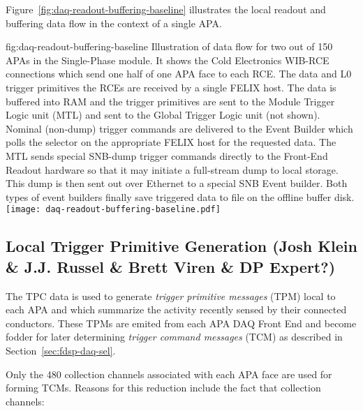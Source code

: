 Figure~\ref{fig:daq-readout-buffering-baseline} illustrates the local
readout and buffering data flow in the context of a single APA.  

\begin{dunefigure}{fig:daq-readout-buffering-baseline}
  {Illustration of data flow for two out of 150 APAs in the
    Single-Phase module. 
    It shows the Cold Electronics WIB-RCE connections which send one
    half of one APA face to each RCE. 
    The data and L0 trigger primitives the RCEs are received by a
    single FELIX host. 
    The data is buffered into RAM and the trigger primitives are sent
    to the Module Trigger Logic unit (MTL) and sent to the Global
    Trigger Logic unit (not shown). 
    Nominal (non-dump) trigger commands are delivered to the Event
    Builder which polls the selector on the appropriate FELIX host for
    the requested data.
    The MTL sends special SNB-dump trigger commands directly to the
    Front-End Readout hardware so that it may initiate a full-stream
    dump to local storage. 
    This dump is then sent out over Ethernet to a special SNB Event
    builder. 
    Both types of event builders finally save triggered data to file
    on the offline buffer disk.}
\texttt{[image: daq-readout-buffering-baseline.pdf]}%
\end{dunefigure}


\subsection{Local Trigger Primitive Generation (Josh Klein \& J.J. Russel \& Brett Viren \& DP Expert?)}
\label{sec:fdsp-daq-ltr}


The TPC data is used to generate \textit{trigger primitive messages}
(TPM) local to each APA and which summarize the activity recently
sensed by their connected conductors.  These TPMs are emited from each
APA DAQ Front End and become fodder for later determining
\textit{trigger command messages} (TCM) as described in
Section~\ref{sec:fdsp-daq-sel}.

Only the 480 collection channels associated with each APA face are
used for forming TCMs.  Reasons for this reduction include the fact
that collection channels:

